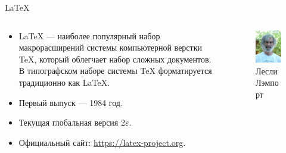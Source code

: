 \documentclass[10pt,aspectratio=169]{beamer}
\begin{document}
    \begin{frame}{LaTeX}
   		\begin{columns}
    		\begin{column}{0.63\textwidth}
		    	\begin{itemize}
		          	\item LaTeX --- наиболее популярный набор макрорасширений системы компьютерной верстки \TeX, который облегчает набор сложных документов. В типографском наборе системы \TeX \hspace{0.4mm} форматируется традиционно как \LaTeX.
		          	\item Первый выпуск --- 1984 год.
		          	\item Текущая глобальная версия 2$\varepsilon$.
		          	\item Официальный сайт: \url{https://latex-project.org}.
		    	\end{itemize}
    		\end{column}
    		\begin{column}{0.25\textwidth}
    			\begin{figure}[h!]
   				\centering
   				\includegraphics[width=\textwidth]{img/lamport.jpg}
   				\caption{Лесли Лэмпорт}
   				\label{fig:lamport}
   			\end{figure}
   			\end{column}
   		\end{columns}
    \end{frame}
    
\end{document}
